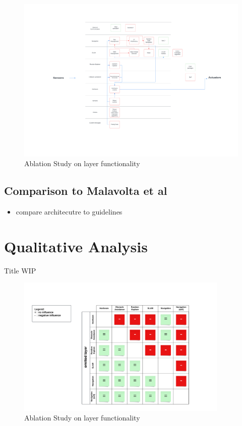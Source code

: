 \documentclass[]{article}
\begin{document}
	\begin{figure}[ht]
		\begin{flushleft}
		\includegraphics[width=1.1\textwidth]{Graphics/ArchitectureOverview}
		\caption{Ablation Study on layer functionality}
		\label{fig: fig8}
		\end{flushleft}
	\end{figure}
	
	
	
	

	
	\subsection{Comparison to Malavolta et al}
	\begin{itemize}
		\item compare architecutre to guidelines
	\end{itemize}
	
	\section{Qualitative Analysis}  Title WIP
	
	\begin{figure}[ht]
		\centering
		\includegraphics[width=0.9\textwidth]{Graphics/AblationStudy}
		\caption{Ablation Study on layer functionality}
		\label{fig: fig9}
	\end{figure}
	
\end{document}
